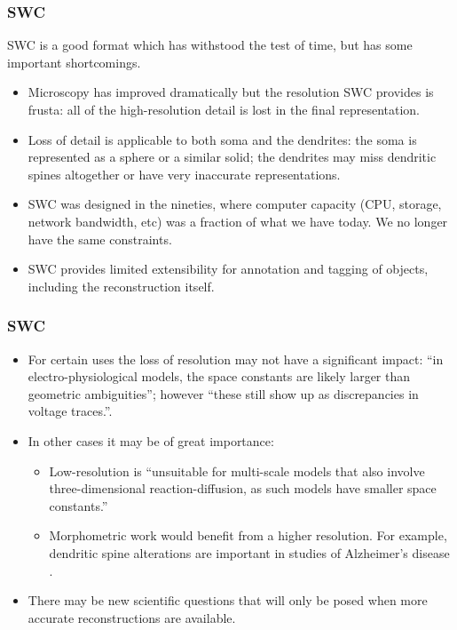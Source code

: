\documentclass{beamer}
\begin{document}
\begin{frame}
\frametitle{SWC}

SWC is a good format which has withstood the test of time, but has
some important shortcomings.
\pause

\begin{itemize}
\item Microscopy has improved dramatically but the resolution SWC
  provides is frusta: all of the high-resolution detail is lost in the
  final representation.
\pause
\item Loss of detail is applicable to both soma and the dendrites: the
  soma is represented as a sphere or a similar solid; the dendrites
  may miss dendritic spines altogether or have very inaccurate
  representations.
\pause
\item SWC was designed in the nineties, where computer capacity (CPU,
  storage, network bandwidth, etc) was a fraction of what we have
  today. We no longer have the same constraints.
\pause
\item SWC provides limited extensibility for annotation and tagging
  of objects, including the reconstruction itself.
\end{itemize}

\end{frame}

\begin{frame}
\frametitle{SWC}

\begin{itemize}
\item For certain uses the loss of resolution may not have a
  significant impact: ``in electro-physiological models, the space
  constants are likely larger than geometric ambiguities''; however
  ``these still show up as discrepancies in voltage
  traces.''\cite{mcdougal2013water}.
\pause
\item In other cases it may be of great importance:
  \begin{itemize}
  \item Low-resolution is ``unsuitable for multi-scale models that
    also involve three-dimensional reaction-diffusion, as such models
    have smaller space constants.''\cite{mcdougal2013water}
  \pause
  \item Morphometric work would benefit from a higher resolution. For
    example, dendritic spine alterations are important in studies of
    Alzheimer's disease \cite{smith2009reversal}.
  \pause
  \end{itemize}
\item There may be new scientific questions that will only be posed
  when more accurate reconstructions are available.
\pause
\end{itemize}

\end{frame}
\end{document}

